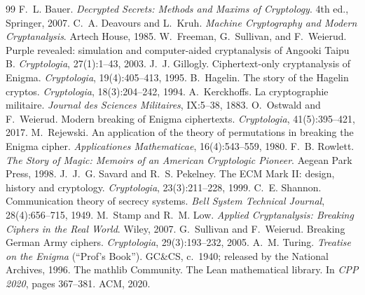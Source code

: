 \documentclass[11pt]{article}
\theoremstyle{definition}
\begin{document}
\begin{thebibliography}{99}
\small
{} F.~L. Bauer. \emph{Decrypted Secrets: Methods and Maxims of Cryptology}. 4th ed., Springer, 2007.
 C.~A. Deavours and L.~Kruh. \emph{Machine Cryptography and Modern Cryptanalysis}. Artech House, 1985.
 W.~Freeman, G.~Sullivan, and F.~Weierud. Purple revealed: simulation and computer-aided cryptanalysis of Angooki Taipu B. \emph{Cryptologia}, 27(1):1--43, 2003.
 J.~J. Gillogly. Ciphertext-only cryptanalysis of Enigma. \emph{Cryptologia}, 19(4):405--413, 1995.
 B.~Hagelin. The story of the Hagelin cryptos. \emph{Cryptologia}, 18(3):204--242, 1994.
 A.~Kerckhoffs. La cryptographie militaire. \emph{Journal des Sciences Militaires}, IX:5--38, 1883.
 O.~Ostwald and F.~Weierud. Modern breaking of Enigma ciphertexts. \emph{Cryptologia}, 41(5):395--421, 2017.
 M.~Rejewski. An application of the theory of permutations in breaking the Enigma cipher. \emph{Applicationes Mathematicae}, 16(4):543--559, 1980.
 F.~B. Rowlett. \emph{The Story of Magic: Memoirs of an American Cryptologic Pioneer}. Aegean Park Press, 1998.
 J.~J.~G. Savard and R.~S. Pekelney. The ECM Mark II: design, history and cryptology. \emph{Cryptologia}, 23(3):211--228, 1999.
 C.~E. Shannon. Communication theory of secrecy systems. \emph{Bell System Technical Journal}, 28(4):656--715, 1949.
 M.~Stamp and R.~M. Low. \emph{Applied Cryptanalysis: Breaking Ciphers in the Real World}. Wiley, 2007.
 G.~Sullivan and F.~Weierud. Breaking German Army ciphers. \emph{Cryptologia}, 29(3):193--232, 2005.
 A.~M. Turing. \emph{Treatise on the Enigma} (``Prof's Book''). GC\&CS, c.~1940; released by the National Archives, 1996.
 The mathlib Community. The Lean mathematical library. In \emph{CPP 2020}, pages 367--381. ACM, 2020.
\end{thebibliography}
\end{document}
